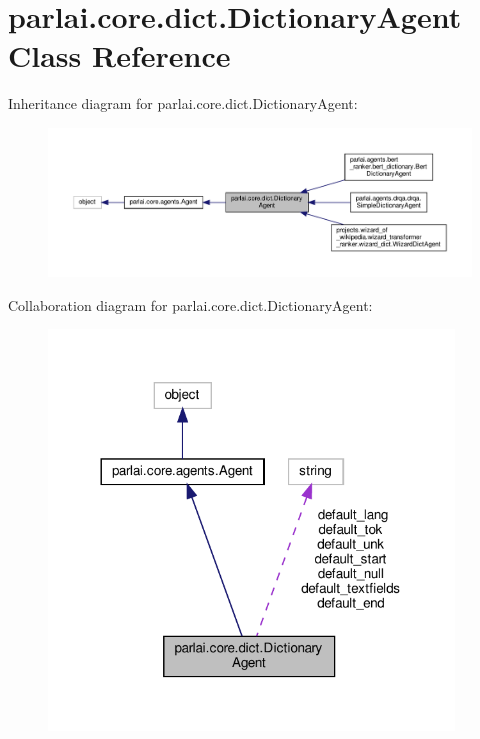 \hypertarget{classparlai_1_1core_1_1dict_1_1DictionaryAgent}{}\section{parlai.\+core.\+dict.\+Dictionary\+Agent Class Reference}
\label{classparlai_1_1core_1_1dict_1_1DictionaryAgent}


Inheritance diagram for parlai.\+core.\+dict.\+Dictionary\+Agent\+:
\nopagebreak
\begin{figure}[H]
\begin{center}
\leavevmode
\includegraphics[width=350pt]{d5/df4/classparlai_1_1core_1_1dict_1_1DictionaryAgent__inherit__graph}
\end{center}
\end{figure}


Collaboration diagram for parlai.\+core.\+dict.\+Dictionary\+Agent\+:
\nopagebreak
\begin{figure}[H]
\begin{center}
\leavevmode
\includegraphics[width=305pt]{d1/df9/classparlai_1_1core_1_1dict_1_1DictionaryAgent__coll__graph}
\end{center}
\end{figure}
